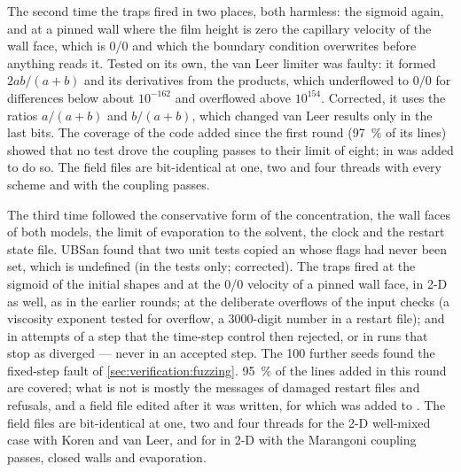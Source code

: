 The second time the traps fired in two places, both harmless: the sigmoid
again, and at a pinned wall where the film height is zero the capillary
velocity of the wall face, which is 0/0 and which the boundary condition
overwrites before anything reads it. Tested on its own, the van Leer limiter
was faulty: it formed $2ab/(a+b)$ and its derivatives from the products,
which underflowed to $0/0$ for differences below about $10^{-162}$ and
overflowed above $10^{154}$. Corrected, it uses the ratios $a/(a+b)$ and
$b/(a+b)$, which changed van Leer results only in the last bits. The coverage of the
code added since the first round (\SI{97}{\percent} of its lines) showed that
no test drove the  coupling passes to their limit of eight;
 in  was added to do so. The field files are
bit-identical at one, two and four threads with every scheme and with the
coupling passes.

The third time followed the conservative form of the 
concentration, the wall faces of both models, the limit of evaporation to the
solvent, the clock and the restart state file. UBSan found that two unit
tests copied an  whose flags had never been set, which is
undefined (in the tests only; corrected). The traps fired at the sigmoid of
the initial shapes and at the 0/0 velocity of a pinned wall face, in 2-D
as well, as in the earlier rounds; at the deliberate overflows of the input checks (a
viscosity exponent tested for overflow, a 3000-digit number in a restart
file); and in attempts of a step that the time-step control then rejected,
or in runs that stop as diverged --- never in an accepted step. The 100
further  seeds found the fixed-step fault of
\cref{sec:verification:fuzzing}. \SI{95}{\percent} of the lines added in
this round are covered; what is not is mostly the messages of damaged
restart files and refusals, and a field file edited after it was written,
for which  was added to .
The field files are bit-identical at one, two and four threads for the 2-D
well-mixed case with Koren and van Leer, and for  in 2-D with the
Marangoni coupling passes, closed walls and evaporation.

